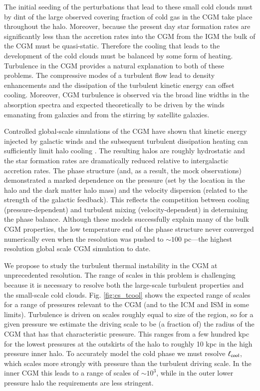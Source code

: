 \documentclass[11pt,letterpaper,english]{article}
\begin{document}
The initial seeding of the perturbations that lead to these small cold clouds must by dint of the large observed covering fraction of cold gas in the CGM take place throughout the halo. Moreover, because the present day star formation rates are significantly less than the accretion rates into the CGM from the IGM the bulk of the CGM must be quasi-static. Therefore the cooling that leads to the development of the cold clouds must be balanced by some form of heating. Turbulence in the CGM provides a natural explanation to both of these problems. The compressive modes of a turbulent flow lead to density enhancements and the dissipation of the turbulent kinetic energy can offset cooling. Moreover, CGM turbulence is observed via the broad line widths in the absorption spectra and expected theoretically to be driven by the winds emanating from galaxies and from the stirring by satellite galaxies. 

Controlled global-scale simulations of the CGM have shown that kinetic energy injected by galactic winds and the subsequent turbulent dissipation heating can sufficiently limit halo cooling \cite{Fielding17}. The resulting halos are roughly hydrostatic and the star formation rates are dramatically reduced relative to intergalactic accretion rates. The phase structure (and, as a result, the mock observations) demonstrated a marked dependence on the pressure (set by the location in the halo and the dark matter halo mass) and the velocity dispersion (related to the strength of the galactic feedback). This reflects the competition between cooling (pressure-dependent) and turbulent mixing (velocity-dependent) in determining the phase balance.
Although these models successfully explain many of the bulk CGM properties, the low temperature end of the phase structure never converged numerically even when the resolution was pushed to $\sim 100$ pc---the highest resolution global scale CGM simulation to date. 

We propose to study the turbulent thermal instability in the CGM at unprecedented resolution. The range of scales in this problem is challenging because it is necessary to resolve both the large-scale turbulent properties and the small-scale cold clouds. Fig. \ref{fig:cs_tcool} shows the expected range of scales for a range of pressures relevant to the CGM (and to the ICM and ISM in some limits). Turbulence is driven on scales roughly equal to size of the region, so for a given pressure we estimate the driving scale to be (a fraction of) the radius of the CGM that has that characteristic pressure. This ranges from a few hundred kpc for the lowest pressures at the outskirts of the halo to roughly 10 kpc in the high pressure inner halo. To accurately model the cold phase we must resolve $\ell_{\rm cool}$, which scales more strongly with pressure than the turbulent driving scale. In the inner CGM this leads to a range of scales of $\sim10^3$, while in the outer lower pressure halo the requirements are less stringent.
\end{document}

